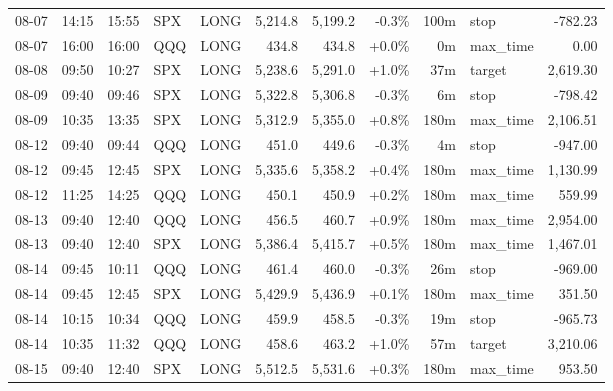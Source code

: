 \documentclass[11pt,a4paper,twoside]{article}
\begin{document}
\begin{center}
\begin{longtable}{>{\color{txtmain}}l l l l l r r r r >{\color{txtmain}}l r}
08-07 & 14:15 & 15:55 & SPX & LONG & 5,214.8 & 5,199.2 & \textcolor{lossred}{-0.3\%} & 100m & stop & \textcolor{lossred}{-782.23} \\
08-07 & 16:00 & 16:00 & QQQ & LONG & 434.8 & 434.8 & \textcolor{wingreen}{+0.0\%} & 0m & max\_time & \textcolor{wingreen}{0.00} \\
08-08 & 09:50 & 10:27 & SPX & LONG & 5,238.6 & 5,291.0 & \textcolor{wingreen}{+1.0\%} & 37m & target & \textcolor{wingreen}{2,619.30} \\
08-09 & 09:40 & 09:46 & SPX & LONG & 5,322.8 & 5,306.8 & \textcolor{lossred}{-0.3\%} & 6m & stop & \textcolor{lossred}{-798.42} \\
08-09 & 10:35 & 13:35 & SPX & LONG & 5,312.9 & 5,355.0 & \textcolor{wingreen}{+0.8\%} & 180m & max\_time & \textcolor{wingreen}{2,106.51} \\
08-12 & 09:40 & 09:44 & QQQ & LONG & 451.0 & 449.6 & \textcolor{lossred}{-0.3\%} & 4m & stop & \textcolor{lossred}{-947.00} \\
08-12 & 09:45 & 12:45 & SPX & LONG & 5,335.6 & 5,358.2 & \textcolor{wingreen}{+0.4\%} & 180m & max\_time & \textcolor{wingreen}{1,130.99} \\
08-12 & 11:25 & 14:25 & QQQ & LONG & 450.1 & 450.9 & \textcolor{wingreen}{+0.2\%} & 180m & max\_time & \textcolor{wingreen}{559.99} \\
08-13 & 09:40 & 12:40 & QQQ & LONG & 456.5 & 460.7 & \textcolor{wingreen}{+0.9\%} & 180m & max\_time & \textcolor{wingreen}{2,954.00} \\
08-13 & 09:40 & 12:40 & SPX & LONG & 5,386.4 & 5,415.7 & \textcolor{wingreen}{+0.5\%} & 180m & max\_time & \textcolor{wingreen}{1,467.01} \\
08-14 & 09:45 & 10:11 & QQQ & LONG & 461.4 & 460.0 & \textcolor{lossred}{-0.3\%} & 26m & stop & \textcolor{lossred}{-969.00} \\
08-14 & 09:45 & 12:45 & SPX & LONG & 5,429.9 & 5,436.9 & \textcolor{wingreen}{+0.1\%} & 180m & max\_time & \textcolor{wingreen}{351.50} \\
08-14 & 10:15 & 10:34 & QQQ & LONG & 459.9 & 458.5 & \textcolor{lossred}{-0.3\%} & 19m & stop & \textcolor{lossred}{-965.73} \\
08-14 & 10:35 & 11:32 & QQQ & LONG & 458.6 & 463.2 & \textcolor{wingreen}{+1.0\%} & 57m & target & \textcolor{wingreen}{3,210.06} \\
08-15 & 09:40 & 12:40 & SPX & LONG & 5,512.5 & 5,531.6 & \textcolor{wingreen}{+0.3\%} & 180m & max\_time & \textcolor{wingreen}{953.50} \\

\end{longtable}
\end{center}
\end{document}
